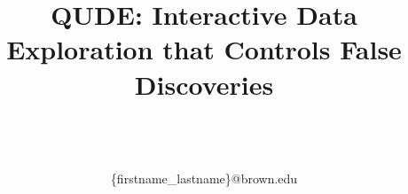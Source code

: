 \documentclass{sig}
\begin{document}
\title{QUDE: Interactive Data Exploration that Controls False Discoveries}

\author{
\alignauthor
\vspace*{-30pt}
\begin{tabular}{cccc}
\end{tabular}\\
\vspace{1.5mm}
\\
\vspace{0.75mm}
\{firstname\_lastname\}@brown.edu
}

\date{}
\maketitle

\begin{abstract}

\end{abstract}




%








\balance
\begin{scriptsize}


\end{scriptsize}
\end{document}
